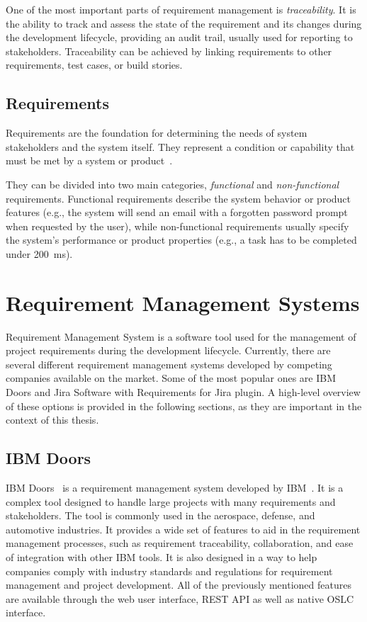 One of the most important parts of requirement management is \emph{traceability}. It is the ability to track and assess the state of the requirement and its changes during the development lifecycle, providing an audit trail, usually used for reporting to stakeholders. Traceability can be achieved by linking requirements to other requirements, test cases, or build stories.

\subsection*{Requirements}
\label{sec:requirements}
Requirements are the foundation for determining the needs of system stakeholders and the system itself. They represent a condition or capability
that must be met by a system or product \cite{IEEE_24765-2017}.

They can be divided into two main categories, \emph{functional} and \emph{non-functional} requirements. Functional requirements describe the system behavior or product features (e.g., the system will send an email with a forgotten password prompt when requested by the user), while non-functional requirements usually specify the system's performance or product properties (e.g., a task has to be completed under 200 ms).

\section{Requirement Management Systems}
Requirement Management System is a software tool used for the management of project requirements during the development lifecycle. Currently, there are several different requirement management systems developed by competing companies available on the market. Some of the most popular ones are IBM Doors and Jira Software with Requirements for Jira plugin. A high-level overview of these options is provided in the following sections, as they are important in the context of this thesis.

\subsection*{IBM Doors}
IBM Doors \cite{ibm_doors} is a requirement management system developed by IBM \cite{ibm}. It is a complex tool designed to handle large projects with many requirements and stakeholders. The tool is commonly used in the aerospace, defense, and automotive industries. It provides a wide set of features to aid in the requirement management processes, such as requirement traceability, collaboration, and ease of integration with other IBM tools. It is also designed in a way to help companies comply with industry standards and regulations for requirement management and project development. All of the previously mentioned features are available through the web user interface, REST API as well as native OSLC interface.

